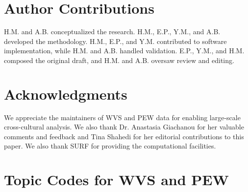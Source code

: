 \documentclass[11pt]{article}
\begin{document}
\section*{Author Contributions}

H.M. and A.B. conceptualized the research. H.M., E.P., Y.M., and A.B. developed the methodology. H.M., E.P., and Y.M. contributed to software implementation, while H.M. and A.B. handled validation. E.P., Y.M., and H.M. composed the original draft, and H.M. and A.B. oversaw review and editing.


\section*{Acknowledgments}
We appreciate the maintainers of WVS and PEW data for enabling large-scale cross-cultural analysis. We also thank Dr. Anastasia Giachanou for her valuable comments and feedback and Tina Shahedi for her editorial contributions to this paper. We also thank SURF for providing the computational facilities.




%


%


\appendix


\section{Topic Codes for WVS and PEW}
\label{appendix:topic_codes}
\end{document}
